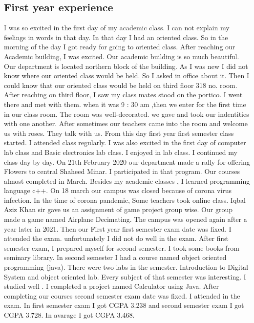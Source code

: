 \documentclass{article}
\begin{document}
\subsection{First year experience}
I was so excited in the first day of my academic class. I can not explain my feelings in words in that day. In that day I had an oriented class. So in the morning of the day I got ready for going to oriented class. After reaching our Academic building, I was excited. Our academic building is so much beautiful. Our department is located northern block of the building. As I was new I did not know where our oriented class would be held. So I asked in office about it. Then I could know that our oriented class would be held on third floor 318 no. room. After reaching on third floor, I saw my class mates stood on the portico. I went there and met with them. when it was 9 : 30 am ,then we enter for the first time in our class room.  The room was well-decorated. we gave and took our indentities with one another. After sometimes our teachers came into the room and welcome us with roses. They talk with us. From this day first year first semester class started. I attended class regularly. I was also excited in the first day of computer lab class and Basic electronics lab class. I enjoyed in lab class. I continued my class day by day. On 21th February 2020 our department made a rally for offering Flowers to central Shaheed Minar. I participated in that program. Our courses almost completed in March. Besides my academic classes , I learned programming language c++. On 18 march our campus was closed because of corona virus infection. In the time of corona pandemic, Some teachers took online class. Iqbal Aziz Khan sir gave us an assignment of game project group wise. Our group made a game named Airplane Decimating. The campus was opened again after a year later in 2021. Then our First year first semester exam date was fixed. I attended the exam. unfortunately I did not do well in the exam. After first semester exam, I prepared myself for second semester. I took some books from seminary library. In second semester I had a course named object oriented programming (java). There were two labs in the semester. Introduction to Digital System and object oriented lab. Every subject of that semester was interesting. I studied well . I completed a project named Calculator using Java. After completing our courses second semester exam date was fixed. I attended in the exam. In first semester  exam I got CGPA 3.238 and second semester exam I got CGPA 3.728. In avarage I got CGPA 3.468.
\end{document}
